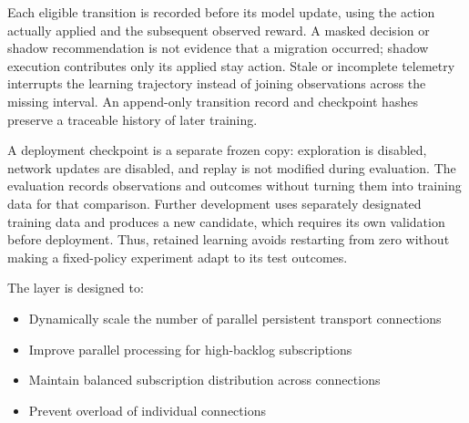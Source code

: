Each eligible transition is recorded before its model update, using the
action actually applied and the subsequent observed reward. A masked decision
or shadow recommendation is not evidence that a migration occurred; shadow
execution contributes only its applied stay action. Stale or incomplete
telemetry interrupts the learning trajectory instead of joining observations
across the missing interval. An append-only transition record and checkpoint
hashes preserve a traceable history of later training.

A deployment checkpoint is a separate frozen copy: exploration is disabled,
network updates are disabled, and replay is not modified during evaluation.
The evaluation records observations and outcomes without turning them into
training data for that comparison. Further development uses separately
designated training data and produces a new candidate, which requires its own
validation before deployment. Thus, retained learning avoids restarting from
zero without making a fixed-policy experiment adapt to its test outcomes.

The layer is designed to:
   
   \begin{itemize}
   	\item Dynamically scale the number of parallel persistent transport connections
   	\item Improve parallel processing for high-backlog subscriptions
   	\item Maintain balanced subscription distribution across connections
   	\item Prevent overload of individual connections
   \end{itemize}

